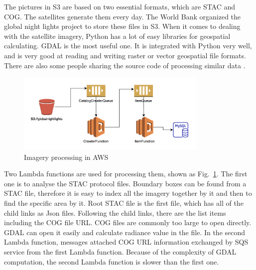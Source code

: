 \documentclass[conference]{IEEEtran}
\begin{document}
The pictures in S3 are based on two essential formats, which are STAC and COG. The satellites generate them every day. 
The World Bank organized the global night lights project to store these files in S3. When it comes to dealing with the satellite 
imagery, Python has a lot of easy libraries for geospatial calculating. GDAL is the most useful one. 
It is integrated with Python very well, and is very good at reading and writing raster or vector geospatial file formats.
There are also some people sharing the source code of processing similar data \cite{Howtopro5:online}.

\begin{figure}[htbp]
    \centerline{\includegraphics[width=260pt]{images/dataprocess.png}}
    \caption{Imagery processing in AWS}
    \label{fig4}
\end{figure}

Two Lambda functions are used for processing them, shown as Fig.~\ref{fig4}. The first one is to analyse the STAC protocol files. Boundary boxes can be found from a STAC file, therefore it is easy to index
all the imagery together by it and then to find the specific area by it. Root STAC file is the first file, which has all of the child links as Json files. 
Following the child links, there are the list items including the COG file URL. COG files are commonly too large to open directly. GDAL can open it easily and calculate radiance 
value in the file. In the second Lambda function, messages attached COG URL information exchanged by SQS service from the first Lambda function. Because of the complexity 
of GDAL computation, the second Lambda function is slower than the first one.
\end{document}
